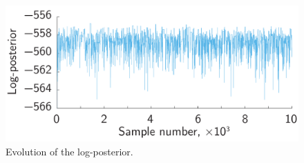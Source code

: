 \begin{figure}
  \centering
  \includegraphics[width=0.7\linewidth]{include/assets/log-posterior.pdf}
  \caption{Evolution of the log-posterior.}
  \vspace{-1.5em}
\end{figure}
